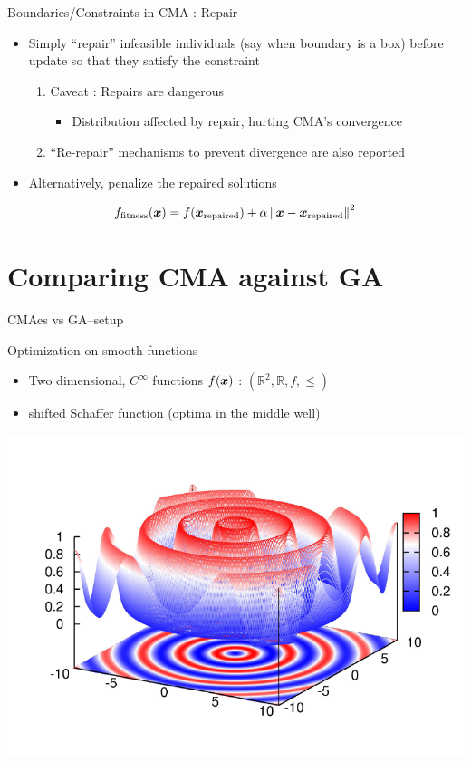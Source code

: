 \documentclass[presentation]{beamer}
\newcommand{\gv}[1]{\ensuremath{\mbox{\boldmath$ #1 $}}}
\newcommand{\norm}[1]{\left\lVert#1\right\rVert}
\begin{document}
\begin{frame}[label={sec:org9d923ca}]{Boundaries/Constraints in CMA : Repair}
\begin{itemize}
\item Simply ``repair'' infeasible individuals (say when boundary is a box) before
update so that they satisfy the constraint
\begin{enumerate}
\item Caveat : Repairs are dangerous
\begin{itemize}
\item Distribution affected by repair, hurting CMA's convergence
\end{itemize}
\item ``Re-repair'' mechanisms to prevent divergence are also reported
\end{enumerate}

\item Alternatively, penalize the repaired solutions
\end{itemize}
\[  f_{\text{fitness}} (\gv{x}) = f(\gv{x}_{\text{repaired}}) + \alpha \norm{\gv{x} -
\gv{x}_{\text{repaired}}}^2 \]
\end{frame}

\section{Comparing CMA against GA}
\label{sec:org90ade3f}
\begin{frame}[label={sec:org96cdde2}]{CMAes vs GA--setup}
\begin{block}{Optimization on smooth functions}
\begin{itemize}
\item Two dimensional, \(C^{\infty}\) functions \(f(\gv{x})\) : \(\left(\mathbb{R}^2,  \mathbb{R}, f, \leq \right)\)
\item shifted Schaffer function (optima in the middle well)
\end{itemize}
\end{block}
\begin{center}
\includegraphics[width=.9\linewidth]{images/schaffer.png}
\end{center}
\end{frame}
\end{document}
